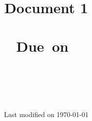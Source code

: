 \documentclass[12pt]{article}
\title{
\vspace{1.5in}
\textmd{\textbf{\hmwkClass \ \\ Document 1 \\ \hmwkTitle}}\\
\normalsize\vspace{0.1in}\small{Due\ on\ \hmwkDueDate}\\
\vspace{0.1in}\large{\textit{\hmwkClassInstructor\ \hmwkClassTime}}
\vspace{3in}
}
\author{\textbf{\hmwkAuthorName} \\ \emailId \\ \studentId}
\date{Last modified on \today} %
\begin{document}
\maketitle




\newpage
\tableofcontents
\newpage
\listoflisting
\newpage

\end{document}
